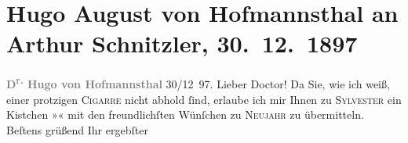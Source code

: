 

               \section[Hugo August von Hofmannsthal an Arthur Schnitzler, 30. 12. 1897]{ Hugo August von Hofmannsthal an Arthur Schnitzler, 30. 12. 1897}\nopagebreak{}\rehead{ }\begin{ledgroupsized}[t]{13cm}\normalsize\beginnumbering{} \toendnotes[C]{\smallbreak\pagebreak[2]} 
\toendnotes[C]{\smallbreak}\pstart
           \noindent{}\centering{}{\pb}\textcolor{gray}{\textbf{D\textsuperscript{r.} Hugo von Hofmannsthal}}\pend
           \pstart
           \raggedleft{}{\pb}30/12 97.\pend
           \pstart{}Lieber Doctor!\pend\pstart
           Da Sie, wie ich weiß, einer protzigen \textsc{Cigarre} nicht abhold
               ſind, erlaube ich mir Ihnen zu \textsc{Sylvester} ein Kistchen\pend
           \pstart
           \centering{}»\textsc{\label{K_L00756_1v}\label{K_L00756_1h}}«\pend
           \pstart
           \noindent{}mit den freundlichſten Wünſchen zu \textsc{Neujahr} zu
               übermitteln.\pend
           \pstart Beſtens grüßend Ihr ergebſter\pend{}\endnumbering{}\end{ledgroupsized}  \newcommand{\dateiname}{L00756}\newcommand{\titel}{Hugo August von Hofmannsthal an Arthur Schnitzler, 30. 12. 1897}\newcommand{\editorInnen}{Martin Anton Müller und Gerd-Hermann Susen}
      